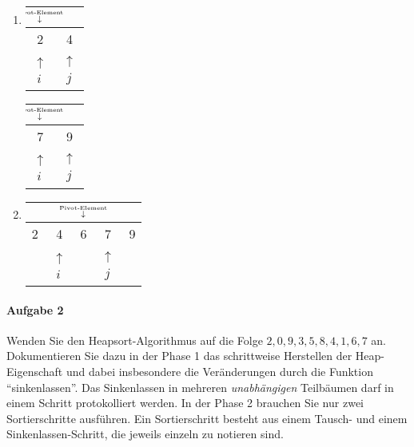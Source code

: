 \documentclass{scrreprt}
\begin{document}
\begin{enumerate}[label={\arabic*. Schritt}]
\item
  \begin{minipage}[t]{.4\textwidth}
     \begin{tabular}{cc}
       $\substack{\makebox[0pt]{\tiny Pivot-Element} \\ \downarrow}$ \\
       \hline
       \multicolumn{1}{|c}{2} & \multicolumn{1}{|c|}{4}\\
       \hline
       $\substack{\uparrow \\ i}$ & $\substack{\uparrow \\ j}$ \\
     \end{tabular}
  \end{minipage}
  \hfill
  \vrule
  \hfill
  \begin{minipage}[t]{.4\textwidth}
    \begin{tabular}{cc}
      $\substack{\makebox[0pt]{\tiny Pivot-Element} \\ \downarrow}$ \\
      \hline
      \multicolumn{1}{|c}{7} & \multicolumn{1}{|c|}{9} \\
      \hline
      $\substack{\uparrow \\ i}$ & $\substack{\uparrow \\ j}$
    \end{tabular}
  \end{minipage}

\item
  \begin{tabular}{ccccc}
    & & $\substack{\makebox[0pt]{\tiny Pivot-Element} \\ \downarrow}$ \\
    \hline
    \multicolumn{1}{|c}{2} & \multicolumn{1}{|c}{4} & \multicolumn{1}{|c}{6} & \multicolumn{1}{|c}{7} & \multicolumn{1}{|c|}{9} \\
    \hline
    & $\substack{\uparrow \\ i}$ & & $\substack{\uparrow \\ j}$
  \end{tabular}
\end{enumerate}

\newpage
\paragraph{Aufgabe 2}
Wenden Sie den Heapsort-Algorithmus auf die Folge
$2, 0, 9, 3, 5, 8, 4, 1, 6, 7$ an.
Dokumentieren Sie dazu in der Phase 1 das schrittweise Herstellen der
Heap-Eigenschaft und dabei insbesondere die Veränderungen durch die Funktion
``sinkenlassen''.
Das Sinkenlassen in mehreren \emph{unabhängigen} Teilbäumen darf in einem
Schritt protokolliert werden.
In der Phase 2 brauchen Sie nur zwei Sortierschritte ausführen.
Ein Sortierschritt besteht aus einem Tausch- und einem Sinkenlassen-Schritt, die
jeweils einzeln zu notieren sind.
\end{document}
